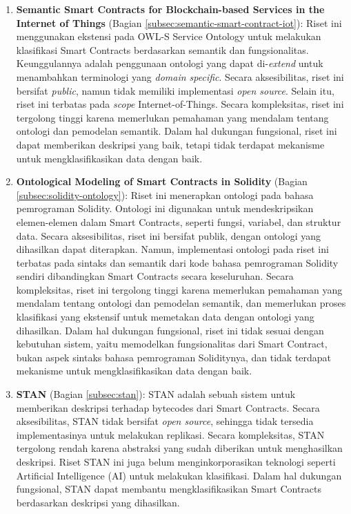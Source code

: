 \begin{enumerate}
    \item \textbf{Semantic Smart Contracts for Blockchain-based Services in the Internet of Things} \parencite{baqa2019semantic} (Bagian \ref{subsec:semantic-smart-contract-iot}): Riset ini menggunakan ekstensi pada OWL-S Service Ontology untuk melakukan klasifikasi Smart Contracts berdasarkan semantik dan fungsionalitas. Keunggulannya adalah penggunaan ontologi yang dapat di-\textit{extend} untuk menambahkan terminologi yang \textit{domain specific}. Secara aksesibilitas, riset ini bersifat \textit{public}, namun tidak memiliki implementasi \textit{open source}. Selain itu, riset ini terbatas pada \textit{scope} Internet-of-Things. Secara kompleksitas, riset ini tergolong tinggi karena memerlukan pemahaman yang mendalam tentang ontologi dan pemodelan semantik. Dalam hal dukungan fungsional, riset ini dapat memberikan deskripsi yang baik, tetapi tidak terdapat mekanisme untuk mengklasifikasikan data dengan baik.
    
    \item \textbf{Ontological Modeling of Smart Contracts in Solidity} \parencite{cano2021toward} (Bagian \ref{subsec:solidity-ontology}): Riset ini menerapkan ontologi pada bahasa pemrograman Solidity. Ontologi ini digunakan untuk mendeskripsikan elemen-elemen dalam Smart Contracts, seperti fungsi, variabel, dan struktur data. Secara aksesibilitas, riset ini bersifat publik, dengan ontologi yang dihasilkan dapat diterapkan. Namun, implementasi ontologi pada riset ini terbatas pada sintaks dan semantik dari kode bahasa pemrograman Solidity sendiri dibandingkan Smart Contracts secara keseluruhan. Secara kompleksitas, riset ini tergolong tinggi karena memerlukan pemahaman yang mendalam tentang ontologi dan pemodelan semantik, dan memerlukan proses klasifikasi yang ekstensif untuk memetakan data dengan ontologi yang dihasilkan. Dalam hal dukungan fungsional, riset ini tidak sesuai dengan kebutuhan sistem, yaitu memodelkan fungsionalitas dari Smart Contract, bukan aspek sintaks bahasa pemrograman Soliditynya, dan tidak terdapat mekanisme untuk mengklasifikasikan data dengan baik.
    
    \item \textbf{STAN} \parencite{stan} (Bagian \ref{subsec:stan}): STAN adalah sebuah sistem untuk memberikan deskripsi terhadap bytecodes dari Smart Contracts. Secara aksesibilitas, STAN tidak bersifat \textit{open source}, sehingga tidak tersedia implementasinya untuk melakukan replikasi. Secara kompleksitas, STAN tergolong rendah karena abstraksi yang sudah diberikan untuk menghasilkan deskripsi. Riset STAN ini juga belum menginkorporasikan teknologi seperti Artificial Intelligence (AI) untuk melakukan klasifikasi. Dalam hal dukungan fungsional, STAN dapat membantu mengklasifikasikan Smart Contracts berdasarkan deskripsi yang dihasilkan.
    

\end{enumerate}
